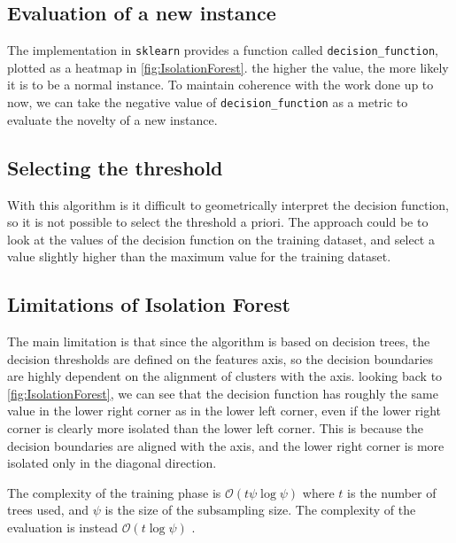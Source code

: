 \subsection{Evaluation of a new instance}
\label{sec:iforest_eval}
The implementation in \texttt{sklearn} provides a function called \texttt{decision\_function}, plotted as a heatmap in \autoref{fig:IsolationForest}. the higher the value, the more likely it is to be a normal instance.
To maintain coherence with the work done up to now, we can take the negative value of \texttt{decision\_function} as a metric to evaluate the novelty of a new instance.

\subsection{Selecting the threshold}
\label{sec:iforest_threshold}
With this algorithm is it difficult to geometrically interpret the decision function, so it is not possible to select the threshold a priori. The approach could be to look at the values of the decision function on the training dataset, and select a value slightly higher than the maximum value for the training dataset.

\subsection{Limitations of Isolation Forest}
The main limitation is that since the algorithm is based on decision trees, the decision thresholds are defined on the features axis, so the decision boundaries are highly dependent on the alignment of clusters with the axis. looking back to \autoref{fig:IsolationForest}, we can see that the decision function has roughly the same value in the lower right corner as in the lower left corner, even if the lower right corner is clearly more isolated than the lower left corner. This is because the decision boundaries are aligned with the axis, and the lower right corner is more isolated only in the diagonal direction.

The complexity of the training phase is $\mathcal{O}(t\psi\log\psi)$ where $t$ is the number of trees used, and $\psi$ is the size of the subsampling size. The complexity of the evaluation is instead $\mathcal{O}(t\log\psi)$ \cite{iforest}.